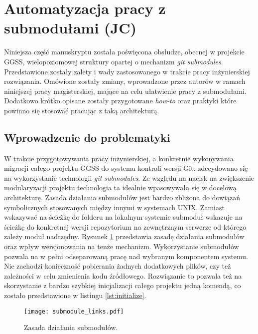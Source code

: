 \clearpage
\section{Automatyzacja pracy z submodułami (JC)}
\label{sec:gitio}

Niniejsza część manuskryptu została poświęcona obsłudze, obecnej w projekcie GGSS, wielopoziomowej struktury  opartej o mechanizm \emph{git submodules}. Przedstawione zostały zalety i wady zastosowanego w trakcie pracy inżynierskiej rozwiązania. Omówione zostały zmiany, wprowadzone przez autorów w ramach niniejszej pracy magisterskiej, mające na celu ułatwienie pracy z submodułami. Dodatkowo krótko opisane zostały przygotowane \emph{how-to} oraz praktyki które powinno się stosować pracując z taką architekturą.

\subsection{Wprowadzenie do problematyki}
W trakcie przygotowywania pracy inżynierskiej, a konkretnie wykonywania migracji całego projektu GGSS do systemu kontroli wersji Git, zdecydowano się na wykorzystanie technologii \emph{git submodules}. Ze względu na nacisk na zwiększenie modularyzacji projektu technologia ta idealnie wpasowywała się w docelową architekturę. Zasada działania submodułów jest bardzo zbliżona do dowiązań symbolicznych stosowanych między innymi w systemach UNIX. Zamiast wskazywać na ścieżkę do folderu na lokalnym systemie submoduł wskazuje na ścieżkę do konkretnej wersji repozytorium na zewnętrznym serwerze od którego zależy moduł nadrzędny. Rysunek \ref{fig:submodules_links} przedstawia zasadę działania submodułów oraz wpływ wersjonowania na tenże mechanizm. Wykorzystanie submodułów pozwala na w pełni odseparowaną pracę nad wybranym komponentem systemu. Nie zachodzi konieczność pobierania żadnych dodatkowych plików, czy też zależności w celu zmienienia kodu źródłowego. Rozwiązanie to pozwala też na skorzystanie z bardzo szybkiej inicjalizacji całego projektu jedną komendą, co zostało przedstawione w listingu \ref{lst:initialize}.

\begin{figure}[H]
    \centering
    \texttt{[image: submodule\_links.pdf]}
    \caption{Zasada działania submodułów.}
    \label{fig:submodules_links}
\end{figure}



